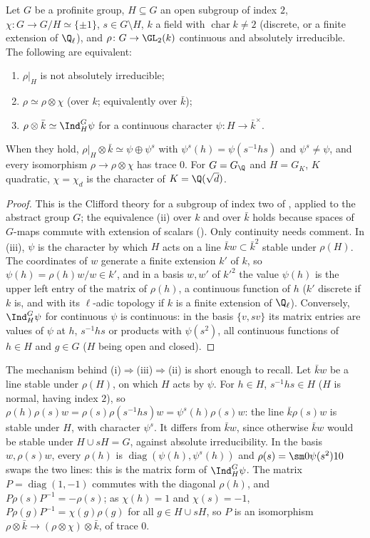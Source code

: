\begin{proposition}\label{prop:galois:index-two}
Let $G$ be a profinite group, $H\subseteq G$ an open subgroup of index $2$, $\chi\colon G\to G/H\simeq\{\pm1\}$, $s\in G\setminus H$, $k$ a field with
$\operatorname{char}k\ne2$ (discrete, or a finite extension of $\Q_\ell$), and $\rho\colon G\to\GL_2(k)$ continuous and absolutely irreducible. The following are
equivalent:
\begin{enumerate}[label=(\roman*)]
\item $\rho|_H$ is not absolutely irreducible;
\item $\rho\simeq\rho\otimes\chi$ (over $k$; equivalently over $\bar k$);
\item $\rho\otimes\bar k\simeq\Ind_H^G\psi$ for a continuous character $\psi\colon H\to\bar k^\times$.
\end{enumerate}
When they hold, $\rho|_H\otimes\bar k\simeq\psi\oplus\psi^s$ with $\psi^s(h)=\psi(s^{-1}hs)$ and $\psi^s\ne\psi$, and every isomorphism $\rho\to\rho\otimes\chi$ has trace $0$.
For $G=G_\Q$ and $H=G_K$, $K$ quadratic, $\chi=\chi_d$ is the character of $K=\Q(\sqrt d)$.
\end{proposition}

\begin{proof}
This is the Clifford theory for a subgroup of index two of , applied to the abstract group $G$; the equivalence (ii) over $k$ and over $\bar k$ holds
because spaces of $G$-maps commute with extension of scalars (). Only continuity needs comment. In (iii), $\psi$ is the character by which $H$ acts on a
line $\bar kw\subset\bar k^2$ stable under $\rho(H)$. The coordinates of $w$ generate a finite extension $k'$ of $k$, so $\psi(h)=\rho(h)w/w\in k'$, and in a basis $w,w'$
of $k'^2$ the value $\psi(h)$ is the upper left entry of the matrix of $\rho(h)$, a continuous function of $h$ ($k'$ discrete if $k$ is, and with its $\ell$-adic
topology if $k$ is a finite extension of $\Q_\ell$). Conversely, $\Ind_H^G\psi$ for continuous $\psi$ is continuous: in the basis $\{v,sv\}$ its matrix entries are values of $\psi$ at
$h$, $s^{-1}hs$ or products with $\psi(s^2)$, all continuous functions of $h\in H$ and $g\in G$ ($H$ being open and closed).
\end{proof}

The mechanism behind (i)$\Rightarrow$(iii)$\Rightarrow$(ii) is short enough to recall. Let $\bar kw$ be a line stable under $\rho(H)$, on which $H$ acts by $\psi$.
For $h\in H$, $s^{-1}hs\in H$ ($H$ is normal, having index $2$), so $\rho(h)\rho(s)w=\rho(s)\rho(s^{-1}hs)w=\psi^s(h)\rho(s)w$: the line $\bar k\rho(s)w$ is stable under
$H$, with character $\psi^s$. It differs from $\bar kw$, since otherwise $\bar kw$ would be stable under $H\cup sH=G$, against absolute irreducibility. In the basis
$w,\rho(s)w$, every $\rho(h)$ is $\operatorname{diag}(\psi(h),\psi^s(h))$ and $\rho(s)=\sm0{\psi(s^2)}10$ swaps the two lines: this is the matrix form of
$\Ind_H^G\psi$. The matrix $P=\operatorname{diag}(1,-1)$ commutes with the diagonal $\rho(h)$, and $P\rho(s)P^{-1}=-\rho(s)$; as $\chi(h)=1$ and $\chi(s)=-1$,
$P\rho(g)P^{-1}=\chi(g)\rho(g)$ for all $g\in H\cup sH$, so $P$ is an isomorphism $\rho\otimes\bar k\to(\rho\otimes\chi)\otimes\bar k$, of trace $0$.

